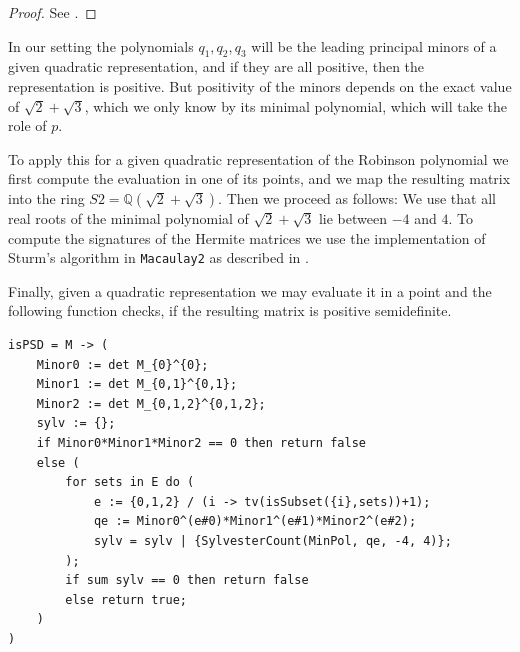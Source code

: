 \documentclass[a4paper,10pt]{amsart}
\theoremstyle{definition}
\theoremstyle{plain}
\newcommand{\Q}{{\mathbb Q}}
\begin{document}
\begin{proof}
    See \cite[Theorem 1.3.33 and Proposition 1.3.36]{Scheiderer2024RAG}.
\end{proof}

In our setting the polynomials $q_1,q_2,q_3$ will be the leading principal minors of a given quadratic representation, and if they are all positive, then the representation is positive. But positivity of the minors depends on the exact value of $\sqrt{2} + \sqrt{3}$, which we only know by its minimal polynomial, which will take the role of $p$.

To apply this for a given quadratic representation of the Robinson polynomial we first compute the evaluation in one of its points, and we map the resulting matrix into the ring $S2 = \Q(\sqrt{2} + \sqrt{3})$. Then we proceed as follows: We use that all real roots of the minimal polynomial of $\sqrt{2} + \sqrt{3}$ lie between $-4$ and $4$. To compute the signatures of the Hermite matrices we use the implementation \cite{RealRootsSource} of Sturm's algorithm in \texttt{Macaulay2} as described in \cite[Theorem 3]{M2RealRoots}.


Finally, given a quadratic representation we may evaluate it in a point and the following function checks, if the resulting matrix is positive semidefinite.

\begin{oframed}
\begin{verbatim}
isPSD = M -> (
    Minor0 := det M_{0}^{0};
    Minor1 := det M_{0,1}^{0,1};
    Minor2 := det M_{0,1,2}^{0,1,2};
    sylv := {};
    if Minor0*Minor1*Minor2 == 0 then return false
    else (
        for sets in E do (
            e := {0,1,2} / (i -> tv(isSubset({i},sets))+1);
            qe := Minor0^(e#0)*Minor1^(e#1)*Minor2^(e#2);
            sylv = sylv | {SylvesterCount(MinPol, qe, -4, 4)};
        );
        if sum sylv == 0 then return false
        else return true;
    )
)
\end{verbatim}
\end{oframed}
\end{document}
